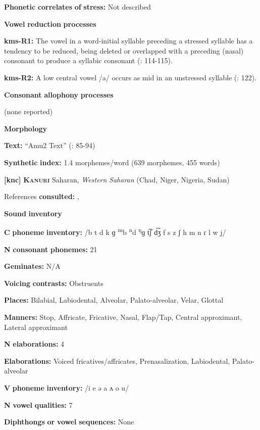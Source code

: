 \begin{styleBody}
\textbf{Phonetic} \textbf{correlates} \textbf{of} \textbf{stress:} Not described

\textbf{Vowel} \textbf{reduction} \textbf{processes}

\textbf{kms-R1:} The vowel in a word-initial syllable preceding a stressed syllable has a tendency to be reduced, being deleted or overlapped with a preceding (nasal) consonant to produce a syllabic consonant (\citealt{SandersSanders1980}: 114-115).

\textbf{kms-R2:} A low central vowel /a/ occurs as mid in an unstressed syllable (\citealt{SandersSanders1980}: 122).

\textbf{Consonant} \textbf{allophony} \textbf{processes}

(none reported)

\textbf{Morphology}

\textbf{Text:} “Amu2 Text” (\citealt{SandersSanders1994}: 85-94)

\textbf{Synthetic} \textbf{index:} 1.4 morphemes/word (639 morphemes, 455 words)

\textbf{[knc]}   \textbf{\textsc{Kanuri}}    Saharan, \textit{Western} \textit{Saharan} (Chad, Niger, Nigeria, Sudan)

References \textbf{consulted:} \citet{Cyffer1998}, \citet{Hutchison1981}

\textbf{Sound} \textbf{inventory}

\textbf{C} \textbf{phoneme} \textbf{inventory:} /b t d k ɡ \textsuperscript{m}b \textsuperscript{n}d \textsuperscript{ŋ}ɡ t͡ʃ d͡ʒ f s z ʃ h m n ɾ l w j/

\textbf{N} \textbf{consonant} \textbf{phonemes:} 21

\textbf{Geminates:} N/A

\textbf{Voicing} \textbf{contrasts:} Obstruents

\textbf{Places:} Bilabial, Labiodental, Alveolar, Palato-alveolar, Velar, Glottal

\textbf{Manners:} Stop, Affricate, Fricative, Nasal, Flap/Tap, Central approximant, Lateral approximant

\textbf{N} \textbf{elaborations:} 4

\textbf{Elaborations:} Voiced fricatives/affricates, Prenasalization, Labiodental, Palato-alveolar

\textbf{V} \textbf{phoneme} \textbf{inventory:} /i e ə a ʌ o u/

\textbf{N} \textbf{vowel} \textbf{qualities:} 7

\textbf{Diphthongs} \textbf{or} \textbf{vowel} \textbf{sequences:} None


\end{styleBody}
